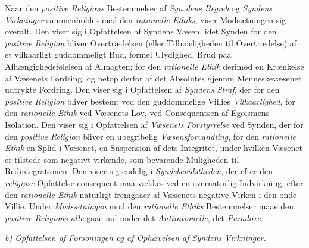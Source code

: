 Naar den \emph{positive Religions} Bestemmelser af \emph{Syn\-%
dens Begreb} og \emph{Syndens Virkninger} sammenholdes med den \emph{rationelle
Ethiks}, viser Modsætningen sig overalt. Den viser sig i Opfattelsen af Syndens
Væsen, idet Synden for den \emph{positive Religion} bliver Overtrædelsen (eller
Tilbøieligheden til Overtrædelse) af et vilkaarligt guddommeligt Bud, formel
Ulydighed, Brud paa Afhængighedsfølelsen af Almagten; for den \emph{rationelle
Ethik} derimod en Krænkelse af Væsenets Fordring, og netop derfor af det
Absolutes gjennm Menneskevæsenet udtrykte Fordring. Den viser sig i Opfattelsen
af \emph{Syndens Straf}, der for den \emph{positive Religion} bliver bestemt ved
den guddommelige Villies \emph{Vilkaarlighed}, for den \emph{rationelle Ethik}
ved Væsenets Lov, ved Consequentsen af Egoismens Isolation. Den viser sig i
Opfattelsen af \emph{Væsenets Forstyrrelse} ved Synden, der for den
\emph{positive Religion} bliver en ubegribelig \emph{Væsensforvandling}, for den
\emph{rationelle Ethik} en Splid i Væsenet, en Suspension af dets Integritet,
under hvilken Væsenet er tilstede som negativt virkende, som bevarende
Muligheden til Redintegrationen. Den viser sig endelig i
\emph{Syndsbevidstheden}, der efter den \emph{religiøse} Opfattelse consequent
maa vækkes ved en overnaturlig Indvirkning, efter den \emph{rationelle Ethik}
naturligt fremgaaer af Væsenets negative Virken i den onde Villie. Under
\emph{Modsætningen} mod den \emph{rationelle Ethiks} Bestemmelser maae den
\emph{positive Religions alle} gaae ind under det \emph{Antirationelle}, det
\emph{Paradoxe}.

\begin{center}
\emph{b) Opfattelsen af Forsoningen og af Ophævelsen af Syndens Virkninger.}
\end{center}


